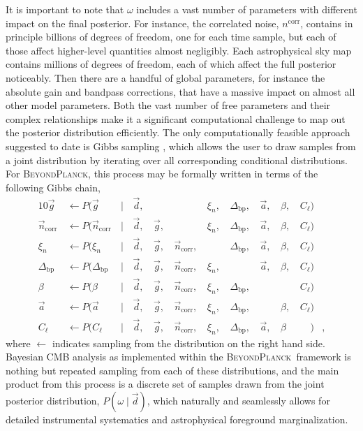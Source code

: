 \documentclass[twocolumn]{aa}
\renewcommand{\d}[0]{\vec{d}}
\newcommand{\n}[0]{\vec{n}}
\renewcommand{\a}[0]{\vec{a}}
\newcommand{\g}[0]{\vec{g}}
\newcommand{\BP}{\textsc{BeyondPlanck}}
\newcommand{\Dbp}[0]{\Delta_{\mathrm{bp}}}
\begin{document}
It is important to note that $\omega$ includes a vast number of
parameters with different impact on the final posterior. For instance,
the correlated noise, $n^{\mathrm{corr}}$, contains in principle
billions of degrees of freedom, one for each time sample, but each of
those affect higher-level quantities almost negligibly. Each
astrophysical sky map contains millions of degrees of freedom, each of
which affect the full posterior noticeably. Then there are a handful
of global parameters, for instance the absolute gain and bandpass
corrections, that have a massive impact on almost all other model
parameters. Both the vast number of free parameters and their complex
relationships make it a significant computational challenge to map out
the posterior distribution efficiently. The only computationally
feasible approach suggested to date is Gibbs sampling \citep{geman:1984}, which
allows the user to draw samples from a joint distribution by iterating
over all corresponding conditional distributions. For \BP, this
process may be formally written in terms of the following Gibbs chain,
\begin{alignat}{10}
\g &\,\leftarrow P(\g&\,\mid &\,\d,&\, & &\,\xi_n, &\,\Dbp, &\,\a, &\,\beta, &\,C_{\ell})\label{eq:conditional_gain}\\
\n_{\mathrm{corr}} &\,\leftarrow P(\n_{\mathrm{corr}}&\,\mid &\,\d, &\,\g, &\,&\,\xi_n,
&\,\Dbp, &\,\a, &\,\beta, &\,C_{\ell})\\
\xi_n &\,\leftarrow P(\xi_n&\,\mid &\,\d, &\,\g, &\,\n_{\mathrm{corr}}, &\,
&\,\Dbp, &\,\a, &\,\beta, &\,C_{\ell})\\
\Dbp &\,\leftarrow P(\Dbp&\,\mid &\,\d, &\,\g, &\,\n_{\mathrm{corr}}, &\,\xi_n,
&\,&\,\a, &\,\beta, &\,C_{\ell})\\
\beta &\,\leftarrow P(\beta&\,\mid &\,\d, &\,\g, &\,\n_{\mathrm{corr}}, &\,\xi_n,
&\,\Dbp, & &\,&\,C_{\ell})\label{eq:conditional_beta}\\
\a &\,\leftarrow P(\a&\,\mid &\,\d, &\,\g, &\,\n_{\mathrm{corr}}, &\,\xi_n,
&\,\Dbp, &\,&\,\beta, &\,C_{\ell})\label{eq:conditional_amp}\\
C_{\ell} &\,\leftarrow P(C_{\ell}&\,\mid &\,\d, &\,\g, &\,\n_{\mathrm{corr}}, &\,\xi_n,
	&\,\Dbp, &\,\a, &\,\beta&\,\phantom{C_{\ell}})&,\label{eq:conditional_bp}
\end{alignat}
where $\leftarrow$ indicates sampling from the distribution on the
right hand side. Bayesian CMB analysis as implemented within the
\BP\ framework is nothing but repeated sampling from each of these
distributions, and the main product from this process is a discrete
set of samples drawn from the joint posterior distribution,
$P(\omega\mid\d)$, which naturally and seamlessly allows for detailed
instrumental systematics and astrophysical foreground
marginalization.
\end{document}
